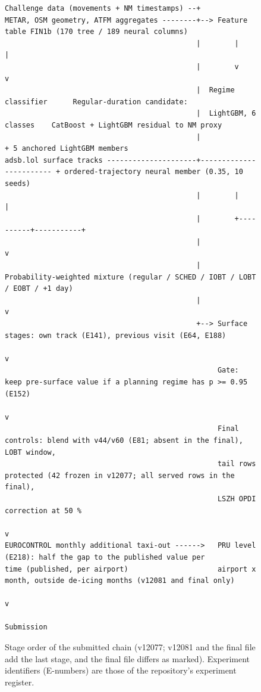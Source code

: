 \documentclass[
  manuscript=article,  %
  layout=preprint,     %
  year=2026,
  volume=4,
]{extra/joas}
\begin{document}
\begin{figure}[htbp]
\centering
{\scriptsize\begin{verbatim}
Challenge data (movements + NM timestamps) --+
METAR, OSM geometry, ATFM aggregates --------+--> Feature table FIN1b (170 tree / 189 neural columns)
                                             |        |                      |
                                             |        v                      v
                                             |  Regime classifier      Regular-duration candidate:
                                             |  LightGBM, 6 classes    CatBoost + LightGBM residual to NM proxy
                                             |                         + 5 anchored LightGBM members
adsb.lol surface tracks ---------------------+------------------------ + ordered-trajectory neural member (0.35, 10 seeds)
                                             |        |                      |
                                             |        +----------+-----------+
                                             |                   v
                                             |   Probability-weighted mixture (regular / SCHED / IOBT / LOBT / EOBT / +1 day)
                                             |                   v
                                             +--> Surface stages: own track (E141), previous visit (E64, E188)
                                                                 v
                                                  Gate: keep pre-surface value if a planning regime has p >= 0.95 (E152)
                                                                 v
                                                  Final controls: blend with v44/v60 (E81; absent in the final), LOBT window,
                                                  tail rows protected (42 frozen in v12077; all served rows in the final),
                                                  LSZH OPDI correction at 50 %
                                                                 v
EUROCONTROL monthly additional taxi-out ------>   PRU level (E218): half the gap to the published value per
time (published, per airport)                     airport x month, outside de-icing months (v12081 and final only)
                                                                 v
                                                             Submission
\end{verbatim}}
\caption{Stage order of the submitted chain (v12077; v12081 and the final file add the last stage, and the final file differs as marked). Experiment identifiers (E-numbers) are those of the repository's experiment register.}\label{fig:5}
\end{figure}
\end{document}
